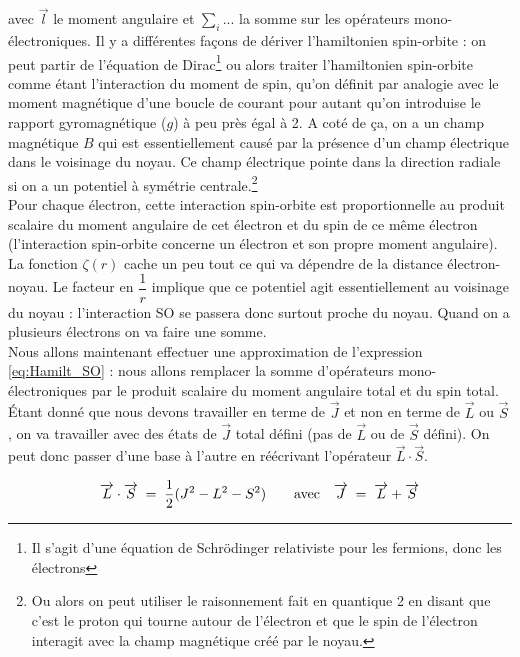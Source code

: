 avec $\overrightarrow{l}$ le moment angulaire et $\sum_i...$ la somme sur les opérateurs mono-électroniques. Il y a différentes façons de dériver l’hamiltonien spin-orbite : on peut partir de l’équation de Dirac\footnote{Il s'agit d'une équation de Schrödinger relativiste pour les fermions, donc les électrons} ou alors traiter l’hamiltonien spin-orbite comme étant l’interaction du moment de spin, qu’on définit par analogie avec le moment magnétique d’une boucle de courant pour autant qu’on introduise le rapport gyromagnétique ($g$) à peu près égal à 2. A coté de ça, on a un champ magnétique $B$ qui est essentiellement causé par la présence d’un champ électrique dans le voisinage du noyau. Ce champ électrique pointe dans la direction radiale si on a un potentiel à symétrie centrale.\footnote{Ou alors on peut utiliser le raisonnement fait en quantique 2 en disant que c'est le proton qui tourne autour de l'électron et que le spin de l'électron interagit avec la champ magnétique créé par le noyau.}\\ 

Pour chaque électron, cette interaction spin-orbite est proportionnelle au produit scalaire du moment angulaire de cet électron et du spin de ce même électron (l'interaction spin-orbite concerne un électron et son propre moment angulaire). La fonction $\zeta(r)$ cache un peu tout ce qui va dépendre de la distance électron-noyau. Le facteur en $\dfrac{1}{r}$ implique que ce potentiel agit essentiellement au voisinage du noyau : l'interaction SO se passera donc surtout proche du noyau. Quand on a plusieurs électrons on va faire une somme.\\

Nous allons maintenant effectuer une approximation de l'expression \eqref{eq:Hamilt_SO} : nous allons remplacer la somme d’opérateurs mono-électroniques par le produit scalaire du moment angulaire total et du spin total. Étant donné que nous devons travailler en terme de $\overrightarrow{J}$ et non en terme de $\overrightarrow{L}$ ou $\overrightarrow{S}$, on va travailler avec des états de $\overrightarrow{J}$ total défini (pas de $\overrightarrow{L}$ ou de $\overrightarrow{S}$ défini). On peut donc passer d’une base à l’autre en réécrivant l’opérateur $\overrightarrow{L}\cdot\overrightarrow{S}$.

\begin{equation}
    \overrightarrow{L}\cdot\overrightarrow{S} \; = \;  \dfrac{1}{2}(J^2-L^2-S^2) \qquad \mathrm{avec} \quad \overrightarrow{J} \; = \;  \overrightarrow{L}+\overrightarrow{S}
    \label{eq:JLS}
\end{equation}

